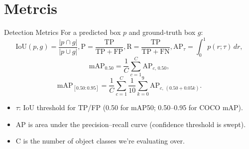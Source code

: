 \documentclass[aspectratio=169]{beamer}
\newcommand{\TP}{\mathrm{TP}}
\newcommand{\FP}{\mathrm{FP}}
\newcommand{\FN}{\mathrm{FN}}
\newcommand{\IoU}{\mathrm{IoU}}
\newcommand{\AP}{\mathrm{AP}}
\newcommand{\mAP}{\mathrm{mAP}}
\newcommand{\Precision}{\mathrm{P}}
\newcommand{\Recall}{\mathrm{R}}
\begin{document}
    \section{Metrcis}
    \begin{frame}{Detection Metrics}
        \vspace{0.6\baselineskip}
        For a predicted box \(p\) and ground-truth box \(g\): \\
        \small
          \[
            \IoU(p,g) = \frac{|p\cap g|}{|p\cup g|},
            \Precision = \frac{\TP}{\TP+\FP},
            \Recall = \frac{\TP}{\TP+\FN},
            \AP_{\tau} = \int_{0}^{1} p(r;\tau)\,dr,
          \]
          \[
            \mAP_{0.50} = \frac{1}{C}\sum_{c=1}^{C}\AP_{c,\,0.50},
          \]
          \[
            \mAP_{[0.50:0.95]} = \frac{1}{C}\sum_{c=1}^{C}\frac{1}{10}
                                 \sum_{k=0}^{9}\AP_{c,\,(0.50+0.05k)}.
          \]
        \begin{itemize}\itemsep2pt
            \item \(\tau\): IoU threshold for TP/FP (0.50 for mAP50; 0.50–0.95 for COCO mAP).
            \item AP is area under the precision–recall curve (confidence threshold is swept).
            \item C is the number of object classes we’re evaluating over.
        \end{itemize}
    \end{frame}

\end{document}
